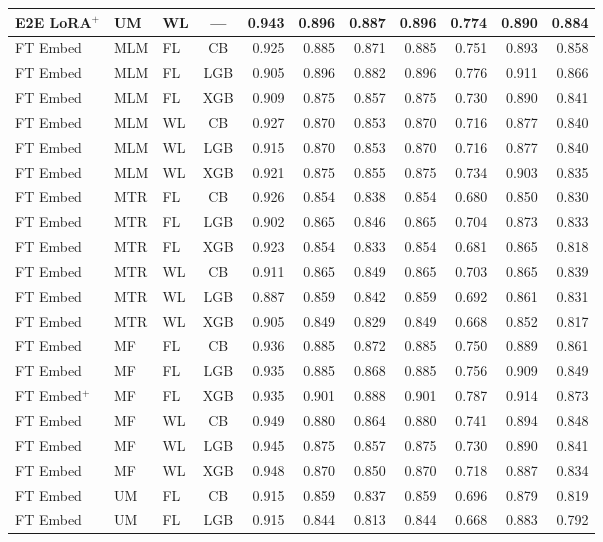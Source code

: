 \documentclass[9pt,a4paper]{article}
\begin{document}
\begin{scriptsize}
\begin{longtable}{lllcrrrrrrr}
E2E LoRA$^{+}$ & UM  & WL & --- & 0.943 & 0.896 & 0.887 & 0.896 & 0.774 & 0.890 & 0.884 \\
\midrule
FT Embed & MLM & FL & CB  & 0.925 & 0.885 & 0.871 & 0.885 & 0.751 & 0.893 & 0.858 \\
FT Embed & MLM & FL & LGB & 0.905 & 0.896 & 0.882 & 0.896 & 0.776 & 0.911 & 0.866 \\
FT Embed & MLM & FL & XGB & 0.909 & 0.875 & 0.857 & 0.875 & 0.730 & 0.890 & 0.841 \\
FT Embed & MLM & WL & CB  & 0.927 & 0.870 & 0.853 & 0.870 & 0.716 & 0.877 & 0.840 \\
FT Embed & MLM & WL & LGB & 0.915 & 0.870 & 0.853 & 0.870 & 0.716 & 0.877 & 0.840 \\
FT Embed & MLM & WL & XGB & 0.921 & 0.875 & 0.855 & 0.875 & 0.734 & 0.903 & 0.835 \\
FT Embed & MTR & FL & CB  & 0.926 & 0.854 & 0.838 & 0.854 & 0.680 & 0.850 & 0.830 \\
FT Embed & MTR & FL & LGB & 0.902 & 0.865 & 0.846 & 0.865 & 0.704 & 0.873 & 0.833 \\
FT Embed & MTR & FL & XGB & 0.923 & 0.854 & 0.833 & 0.854 & 0.681 & 0.865 & 0.818 \\
FT Embed & MTR & WL & CB  & 0.911 & 0.865 & 0.849 & 0.865 & 0.703 & 0.865 & 0.839 \\
FT Embed & MTR & WL & LGB & 0.887 & 0.859 & 0.842 & 0.859 & 0.692 & 0.861 & 0.831 \\
FT Embed & MTR & WL & XGB & 0.905 & 0.849 & 0.829 & 0.849 & 0.668 & 0.852 & 0.817 \\
FT Embed & MF  & FL & CB  & 0.936 & 0.885 & 0.872 & 0.885 & 0.750 & 0.889 & 0.861 \\
FT Embed & MF  & FL & LGB & 0.935 & 0.885 & 0.868 & 0.885 & 0.756 & 0.909 & 0.849 \\
FT Embed$^+$ & MF & FL & XGB & 0.935 & 0.901 & 0.888 & 0.901 & 0.787 & 0.914 & 0.873 \\
FT Embed & MF  & WL & CB  & 0.949 & 0.880 & 0.864 & 0.880 & 0.741 & 0.894 & 0.848 \\
FT Embed & MF  & WL & LGB & 0.945 & 0.875 & 0.857 & 0.875 & 0.730 & 0.890 & 0.841 \\
FT Embed & MF  & WL & XGB & 0.948 & 0.870 & 0.850 & 0.870 & 0.718 & 0.887 & 0.834 \\
FT Embed & UM  & FL & CB  & 0.915 & 0.859 & 0.837 & 0.859 & 0.696 & 0.879 & 0.819 \\
FT Embed & UM  & FL & LGB & 0.915 & 0.844 & 0.813 & 0.844 & 0.668 & 0.883 & 0.792 \\

\end{longtable}
\end{scriptsize}
\end{document}
